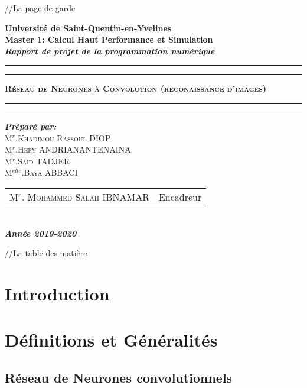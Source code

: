 \documentclass[a4paper,12pt]{report}
\begin{document}
//La page de garde
\begin{center}
{\Large {\bf Université de Saint-Quentin-en-Yvelines}}\\
{\Large {\bf {Master 1: Calcul Haut Performance et Simulation }}}\\
 \textbf{{\Huge  \textit{Rapport de projet de la programmation numérique}}} \\
\hrule
\hrule
{}
{\Huge \textbf{\textsc{ Réseau de Neurones à Convolution (reconaissance d’images) }}}\\
\hrule
\hrule
{}
{\textbf{\textit {Préparé par:}}}\\
{\large\textsc{M$^{r}$.Khadimou Rassoul DIOP}}\\
{\large\textsc{M$^{r}$.Hery ANDRIANANTENAINA}}\\
{\large\textsc{M$^{r}$.Said TADJER }}\\
{\large\textsc{M$^{elle}$.Baya ABBACI}}\\
{\large
\begin{tabular}{ll}
M$^{r}$. \textsc{Mohammed Salah} IBNAMAR  & Encadreur    \\
\end{tabular}
}\\
{\Large\textbf{\textit{ Année 2019-2020}}}
\end{center}


//La table des matière
\tableofcontents


\chapter*{Introduction}


\chapter{Définitions et Généralités}
\section{Réseau de Neurones convolutionnels}
\end{document}
